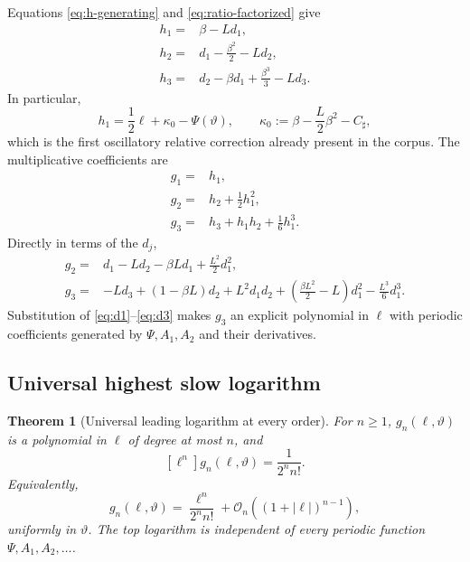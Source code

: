 \documentclass[11pt,oneside]{article}
\numberwithin{equation}{section}
\newtheorem{theorem}{Theorem}[section]
\theoremstyle{definition}
\theoremstyle{remark}
\newcommand{\bigO}{\mathcal O}
\newcommand{\abs}[1]{\left|#1\right|}
\newcommand{\phase}{\vartheta}
\begin{document}
Equations \eqref{eq:h-generating} and \eqref{eq:ratio-factorized} give
\begin{align}
 h_1={}&\beta-Ld_1,
 \label{eq:h1-general}\\
 h_2={}&d_1-\frac{\beta^2}{2}-Ld_2,
 \label{eq:h2-general}\\
 h_3={}&d_2-\beta d_1+\frac{\beta^3}{3}-Ld_3.
 \label{eq:h3-general}
\end{align}
In particular,
\begin{equation}
 h_1=\frac12\ell+\kappa_0-\Psi(\phase),
 \qquad
 \kappa_0:=\beta-\frac L2\beta^2-C_{\sharp},
 \label{eq:h1-imported}
\end{equation}
which is the first oscillatory relative correction already present in the
corpus.  The multiplicative coefficients are
\begin{align}
 g_1={}&h_1,
 \label{eq:g1}\\
 g_2={}&h_2+\frac12h_1^2,
 \label{eq:g2}\\
 g_3={}&h_3+h_1h_2+\frac16h_1^3.
 \label{eq:g3-h}
\end{align}
Directly in terms of the $d_j$,
\begin{align}
 g_2={}&d_1-Ld_2-\beta Ld_1+\frac{L^2}{2}d_1^2,
 \label{eq:g2-d}\\
 g_3={}&-Ld_3+(1-\beta L)d_2+L^2d_1d_2
 +\left(\frac{\beta L^2}{2}-L\right)d_1^2
 -\frac{L^3}{6}d_1^3.
 \label{eq:g3-d}
\end{align}
Substitution of \eqref{eq:d1}--\eqref{eq:d3} makes $g_3$ an explicit
polynomial in $\ell$ with periodic coefficients generated by
$\Psi,A_1,A_2$ and their derivatives.

\subsection{Universal highest slow logarithm}

\begin{theorem}[Universal leading logarithm at every order]
\label{thm:highest-log}
For $n\ge1$, $g_n(\ell,\phase)$ is a polynomial in $\ell$ of degree at most
$n$, and
\begin{equation}
\boxed{
 [\ell^n]g_n(\ell,\phase)=\frac1{2^nn!}.}
 \label{eq:highest-log}
\end{equation}
Equivalently,
\begin{equation}
 g_n(\ell,\phase)=\frac{\ell^n}{2^nn!}
 +\bigO_n((1+\abs\ell)^{n-1}),
 \label{eq:highest-log-asymp}
\end{equation}
uniformly in $\phase$.  The top logarithm is independent of every periodic
function $\Psi,A_1,A_2,\ldots$.
\end{theorem}
\end{document}
